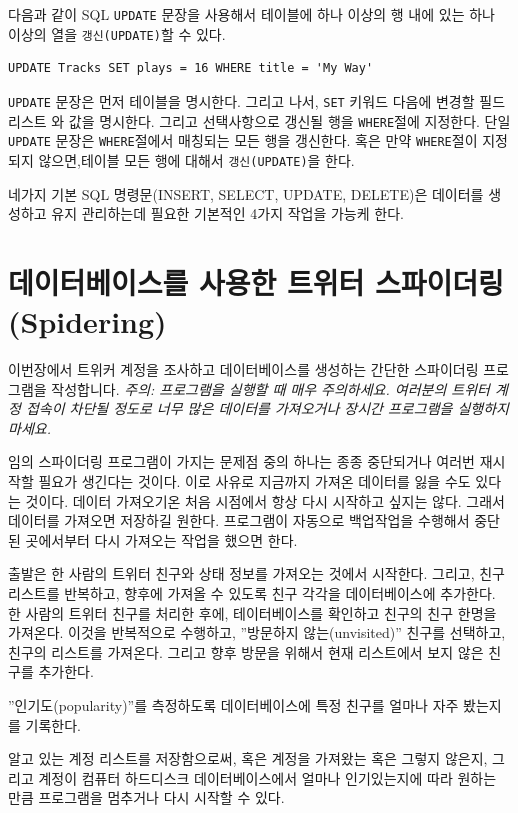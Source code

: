 다음과 같이 SQL {\tt UPDATE} 문장을 사용해서 테이블에 하나 이상의 행 내에 있는 하나 이상의 열을 {\tt 갱신(UPDATE)}할 수 있다.

\beforeverb
\begin{verbatim}
UPDATE Tracks SET plays = 16 WHERE title = 'My Way'
\end{verbatim}
\afterverb
%

{\tt UPDATE} 문장은 먼저 테이블을 명시한다.
그리고 나서, {\tt SET} 키워드 다음에 변경할 필드 리스트 와 값을 명시한다.
그리고 선택사항으로 갱신될 행을 {\tt WHERE}절에 지정한다. 
단일 {\tt UPDATE} 문장은 {\tt WHERE}절에서 매칭되는 모든 행을 갱신한다. 
혹은 만약 {\tt WHERE}절이 지정되지 않으면,테이블 모든 행에 대해서 {\tt 갱신(UPDATE)}을 한다.

네가지 기본 SQL 명령문(INSERT, SELECT, UPDATE, DELETE)은 데이터를 생성하고 유지 관리하는데 필요한 기본적인 4가지 작업을 가능케 한다.

\section{데이터베이스를 사용한 트위터 스파이더링(Spidering)}

이번장에서 트위커 계정을 조사하고 데이터베이스를 생성하는 간단한 스파이더링 프로그램을 작성합니다.
\emph{주의: 프로그램을 실행할 때 매우 주의하세요. 여러분의 트위터 계정 접속이 차단될 정도로 너무 많은 데이터를 가져오거나 
장시간 프로그램을 실행하지 마세요.}

임의 스파이더링 프로그램이 가지는 문제점 중의 하나는 종종 중단되거나 여러번 재시작할 필요가 생긴다는 것이다.
이로 사유로 지금까지 가져온 데이터를 잃을 수도 있다는 것이다.
데이터 가져오기온 처음 시점에서 항상 다시 시작하고 싶지는 않다.
그래서 데이터를 가져오면 저장하길 원한다.
프로그램이 자동으로 백업작업을 수행해서 중단된 곳에서부터 다시 가져오는 작업을 했으면 한다.

출발은 한 사람의 트위터 친구와 상태 정보를 가져오는 것에서 시작한다.
그리고, 친구 리스트를 반복하고, 향후에 가져올 수 있도록 친구 각각을 데이터베이스에 추가한다.
한 사람의 트위터 친구를 처리한 후에, 테이터베이스를 확인하고 친구의 친구 한명을 가져온다. 
이것을 반복적으로 수행하고, ''방문하지 않는(unvisited)'' 친구를 선택하고,친구의 리스트를 가져온다.
그리고 향후 방문을 위해서 현재 리스트에서 보지 않은 친구를 추가한다.

''인기도(popularity)''를 측정하도록 데이터베이스에 특정 친구를 얼마나 자주 봤는지를 기록한다.

알고 있는 계정 리스트를 저장함으로써, 혹은 계정을 가져왔는 혹은 그렇지 않은지, 그리고 계정이 컴퓨터 하드디스크 데이터베이스에서 얼마나 인기있는지에 따라
원하는 만큼 프로그램을 멈추거나 다시 시작할 수 있다.


